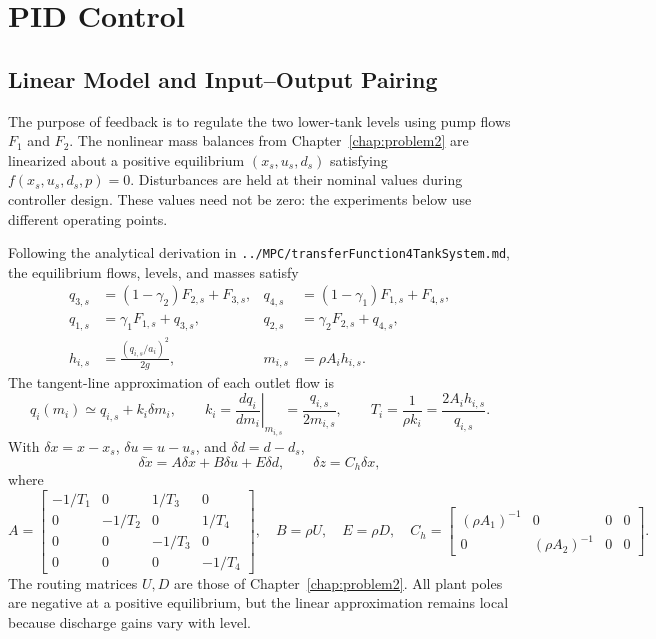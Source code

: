 \chapter{PID Control}
\label{chap:problem3}

\section{Linear Model and Input--Output Pairing}

The purpose of feedback is to regulate the two lower-tank levels using
pump flows $F_1$ and $F_2$. The nonlinear mass balances from
Chapter~\ref{chap:problem2} are linearized about a positive equilibrium
$(x_s,u_s,d_s)$ satisfying $f(x_s,u_s,d_s,p)=0$. Disturbances are held at
their nominal values during controller design. These values need not be
zero: the experiments below use different operating points.

Following the analytical derivation in
\texttt{../MPC/transferFunction4TankSystem.md}, the equilibrium flows,
levels, and masses satisfy
\begin{align}
 q_{3,s}&=(1-\gamma_2)F_{2,s}+F_{3,s},&
 q_{4,s}&=(1-\gamma_1)F_{1,s}+F_{4,s},\\
 q_{1,s}&=\gamma_1F_{1,s}+q_{3,s},&
 q_{2,s}&=\gamma_2F_{2,s}+q_{4,s},\\
 h_{i,s}&=\frac{(q_{i,s}/a_i)^2}{2g},&
 m_{i,s}&=\rho A_i h_{i,s}.
\end{align}
The tangent-line approximation of each outlet flow is
\begin{equation}
 q_i(m_i)\simeq q_{i,s}+k_i\delta m_i,\qquad
 k_i=\left.\frac{dq_i}{dm_i}\right|_{m_{i,s}}
     =\frac{q_{i,s}}{2m_{i,s}},\qquad
 T_i=\frac{1}{\rho k_i}=\frac{2A_i h_{i,s}}{q_{i,s}}.
\end{equation}
With $\delta x=x-x_s$, $\delta u=u-u_s$, and $\delta d=d-d_s$,
\begin{equation}
 \delta\dot x=A\delta x+B\delta u+E\delta d,\qquad
 \delta z=C_h\delta x,
\end{equation}
where
\begin{equation}
 A=\begin{bmatrix}
 -1/T_1&0&1/T_3&0\\0&-1/T_2&0&1/T_4\\
 0&0&-1/T_3&0\\0&0&0&-1/T_4
 \end{bmatrix},\quad B=\rho U,\quad E=\rho D,
 \quad C_h=\begin{bmatrix}(\rho A_1)^{-1}&0&0&0\\
 0&(\rho A_2)^{-1}&0&0\end{bmatrix}.
\end{equation}
The routing matrices $U,D$ are those of Chapter~\ref{chap:problem2}.
All plant poles are negative at a positive equilibrium, but the
linear approximation remains local because discharge gains vary with level.

